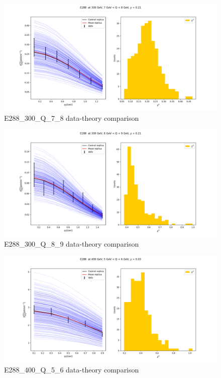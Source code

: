 \documentclass[
]{article}
\begin{document}
\begin{figure}
\centering
\includegraphics{pngplots/E288_300_Q_7_8.png}
\caption{E288\_300\_Q\_7\_8 data-theory comparison}
\end{figure}

\begin{figure}
\centering
\includegraphics{pngplots/E288_300_Q_8_9.png}
\caption{E288\_300\_Q\_8\_9 data-theory comparison}
\end{figure}

\begin{figure}
\centering
\includegraphics{pngplots/E288_400_Q_5_6.png}
\caption{E288\_400\_Q\_5\_6 data-theory comparison}
\end{figure}
\end{document}
